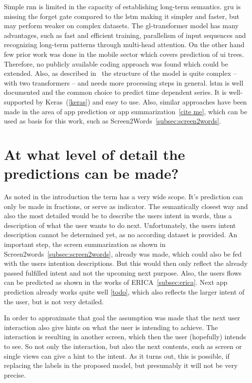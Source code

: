 Simple \gls{rnn} is limited in the capacity of establishing long-term semantics.
\gls{gru} is missing the forget gate compared to the \gls{lstm} making it simpler and faster, but may perform weaker on complex datasets.
The \gls{gl-transformer} model has many advantages, such as fast and efficient training, parallelism of input sequences and recognizing long-term patterns through multi-head attention.
On the other hand few prior work was done in the mobile sector which covers prediction of \gls{ui} trees.
Therefore, no publicly available coding approach was found which could be extended.
Also, as described in~\cite{zhou2021large} the structure of the model is quite complex -- with two transformers -- and needs more processing steps in general.
\gls{lstm} is well documented and the common choice to predict time dependent series.
It is well-supported by Keras~(\ref{keras}) and easy to use.
Also, similar approaches have been made in the area of app prediction or app summarization~\ref{cite me}, which can be used as basis for this work, such as Screen2Words~\ref{subsec:screen2words}.


\section{At what level of detail the predictions can be made?}

As noted in the introduction the term  has a very wide scope.
It's prediction can only be made in fractions, or serve as indicator.
The semantically closest way and also the most detailed would be to describe the users intent in words, thus a description of what the user wants to do next.
Unfortunately, the users intent description cannot be determined yet, as no according dataset is provided.
An important step, the screen summarization as shown in Screen2words~\ref{subsec:screen2words}, already was made, which could also be fed with the users intention descriptions.
But this would then only reflect the already passed fulfilled intent and not the upcoming next purpose.
Also, the users flows can be predicted as shown in the works of ERICA~\ref{subsec:erica}.
Next app prediction already works quite well \ref{todo}, which also reflects the larger intent of the user, but is not very detailed.

In order to approximate that goal the assumption was made that the next user interaction also give hints on what the user is intending to achieve.
The interaction is resulting in another screen, which then the user (hopefully) intends to see.
So not only the interaction, but also the next contents, such as screen or single views can give a hint to the intent.
As it turns out, this is possible, if replacing the labels in the proposed model, but presumably it will not be very precise.

